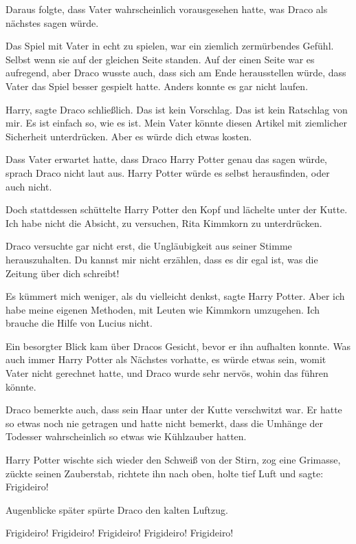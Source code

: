 Daraus folgte, dass Vater wahrscheinlich vorausgesehen hatte, was Draco als
nächstes sagen würde.

Das Spiel mit Vater in echt zu spielen, war ein ziemlich zermürbendes Gefühl.
Selbst wenn sie auf der gleichen Seite standen. Auf der einen Seite war es
aufregend, aber Draco wusste auch, dass sich am Ende herausstellen würde, dass
Vater das Spiel besser gespielt hatte. Anders konnte es gar nicht laufen.

\glqq{}Harry\grqq{}, sagte Draco schließlich. \glqq{}Das ist kein Vorschlag. Das
ist kein Ratschlag von mir. Es ist einfach so, wie es ist. Mein Vater könnte
diesen Artikel mit ziemlicher Sicherheit unterdrücken. Aber es würde dich etwas
kosten.\grqq{}

Dass Vater erwartet hatte, dass Draco Harry Potter genau das sagen würde, sprach
Draco nicht laut aus. Harry Potter würde es selbst herausfinden, oder auch
nicht.

Doch stattdessen schüttelte Harry Potter den Kopf und lächelte unter der Kutte.
\glqq{}Ich habe nicht die Absicht, zu versuchen, Rita Kimmkorn zu
unterdrücken.\grqq{}

Draco versuchte gar nicht erst, die Ungläubigkeit aus seiner Stimme
herauszuhalten. \glqq{}Du kannst mir nicht erzählen, dass es dir egal ist, was
die Zeitung über dich schreibt!\grqq{}

\glqq{}Es kümmert mich weniger, als du vielleicht denkst\grqq{}, sagte Harry
Potter. \glqq{}Aber ich habe meine eigenen Methoden, mit Leuten wie Kimmkorn
umzugehen. Ich brauche die Hilfe von Lucius nicht.\grqq{}

Ein besorgter Blick kam über Dracos Gesicht, bevor er ihn aufhalten konnte. Was
auch immer Harry Potter als Nächstes vorhatte, es würde etwas sein, womit Vater
nicht gerechnet hatte, und Draco wurde sehr nervös, wohin das führen könnte.

Draco bemerkte auch, dass sein Haar unter der Kutte verschwitzt war. Er hatte so
etwas noch nie getragen und hatte nicht bemerkt, dass die Umhänge der Todesser
wahrscheinlich so etwas wie Kühlzauber hatten.

Harry Potter wischte sich wieder den Schweiß von der Stirn, zog eine Grimasse,
zückte seinen Zauberstab, richtete ihn nach oben, holte tief Luft und sagte:
\glqq{}Frigideiro!\grqq{}

Augenblicke später spürte Draco den kalten Luftzug.

\glqq{}Frigideiro! Frigideiro! Frigideiro! Frigideiro! Frigideiro!\grqq{}

